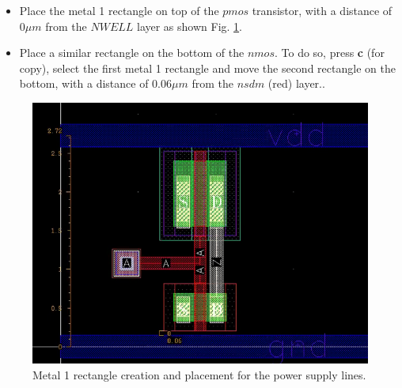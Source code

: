 {\begin{itemize}
			\begin{remark}
		You will learn later that integrated circuits are composed of many rows where each row contains standard cells (INV, MUX, \textit{etc}). \textcolor{red}{\textbf{Therefore, all of your standard cells need in this lab and the next ones need to have the same height}. For this technology, you need to ensure your supply line have an height of  $0.29 \mu m$. The standard cell height being $2.72kk \mu m$, you need to check that the spacing between both metal supply lines is $2.43 \mu m$, as depicted in Fig. \ref{spacing}.} In addition, the width of your cell needs to be a multiple of $4.6 \mu m$. Since the inverter is thinner than this, we chose to use $4.6 \mu m$.
	\end{remark}
	\item Place the metal 1 rectangle on top of the $pmos$ transistor, with a distance of $0 \mu m$ from the $NWELL$ layer as shown Fig. \ref{layout_rectangle}.
	\item Place a similar rectangle on the bottom of the $nmos$. To do so, press \textbf{c} (for copy), select the first metal 1 rectangle and move the second rectangle on the bottom, with a distance of $0.06 \mu m$ from the $nsdm$ (red) layer.. 
\end{itemize}
}

	\begin{figure}[!h]
		\centering
		\includegraphics[scale=0.33]{figures/lab2/6}
		\caption{Metal 1 rectangle creation and placement for the power supply lines.}
		\label{layout_rectangle}
	\end{figure}


